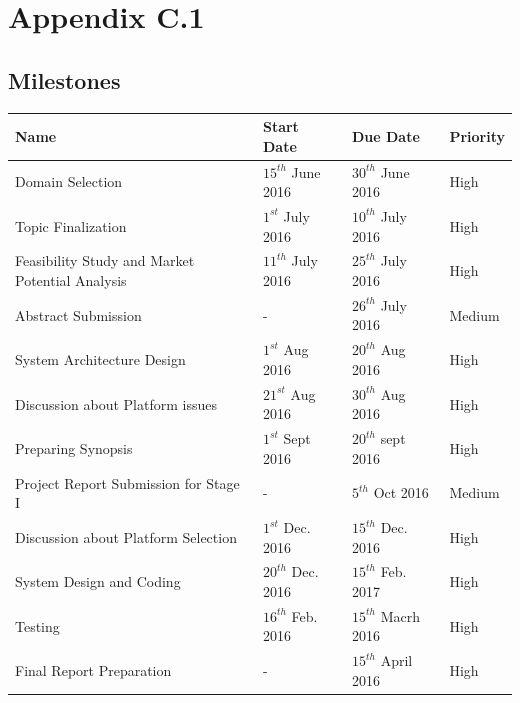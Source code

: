 \documentclass[12pt,a4paper,final]{report}
\DeclareRobustCommand{\gobblefive}[5]{}
\newcommand*{\SkipTocEntry}{\addtocontents{toc}{\gobblefive}}
\begin{document}
\SkipTocEntry\section{Appendix C.1}
\SkipTocEntry\subsection{Milestones}
\begin{center}
\begin{tabular}{ |p{5cm}|p{3cm}|p{3cm}|p{1.5cm}| } 
 \hline
 \textbf{Name} & \textbf{Start Date} & \textbf{Due Date} & \textbf{Priority} \\ \hline
  Domain Selection & $15^{th}$ June 2016 & $30^{th}$ June 2016 & High \\ \hline
  Topic Finalization & $1^{st}$ July 2016 & $10^{th}$ July 2016 & High \\ \hline
  Feasibility Study and Market Potential Analysis & $11^{th}$ July 2016 & $25^{th}$ July 2016 & High \\ \hline
  Abstract Submission & - & $26^{th}$ July 2016 & Medium \\ \hline
  System Architecture Design & $1^{st}$ Aug 2016 & $20^{th}$ Aug 2016 & High \\ \hline    
  Discussion about Platform issues & $21^{st}$ Aug 2016 & $30^{th}$ Aug 2016 & High \\ \hline
  Preparing Synopsis & $1^{st}$ Sept 2016 & $20^{th}$ sept 2016 & High \\ \hline
  Project Report Submission for Stage I & - & $5^{th}$ Oct 2016 & Medium \\ \hline
  Discussion about Platform Selection & $1^{st}$ Dec. 2016 & $15^{th}$ Dec. 2016 & High \\ \hline
  System Design and Coding & $20^{th}$ Dec. 2016 & $15^{th}$ Feb. 2017 & High \\ \hline
  Testing & $16^{th}$ Feb. 2016 & $15^{th}$ Macrh 2016 & High \\ \hline
  Final Report Preparation & - & $15^{th}$ April 2016 & High \\ \hline
\end{tabular}
\end{center}
\end{document}
